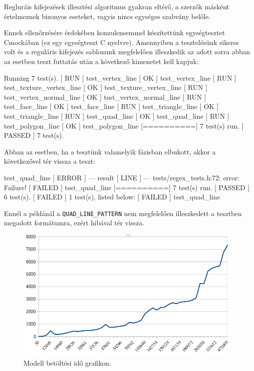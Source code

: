 

Regluráis kifejezések illesztési algoritmus gyakran eltérő, a szerzők másként értelmeznek bizonyos eseteket, vagyis nincs egységes szabvány belőle.

Ennek ellenőrzésére érdekében konzulensemmel készítettünk egységtesztet Cmockában (ez egy egységteszt C nyelvre).\cite{andreas2014cmocka} Amennyiben a tesztelésünk sikeres volt és a reguláris kifejezés sablonunk megfelelően illeszkedik az adott sorra abban az esetben teszt futtatás után a következő kimenetet kell kapjuk:
\bigskip
\begin{python}
[==========] Running 7 test(s).
[ RUN      ] test_vertex_line
[       OK ] test_vertex_line
[ RUN      ] test_texture_vertex_line
[       OK ] test_texture_vertex_line
[ RUN      ] test_vertex_normal_line
[       OK ] test_vertex_normal_line
[ RUN      ] test_face_line
[       OK ] test_face_line
[ RUN      ] test_triangle_line
[       OK ] test_triangle_line
[ RUN      ] test_quad_line
[       OK ] test_quad_line
[ RUN      ] test_polygon_line
[       OK ] test_polygon_line
[==========] 7 test(s) run.
[  PASSED  ] 7 test(s).
\end{python}
\newpage

\noindent Abban az esetben, ha a tesztünk valamelyik fázisban elbukott, akkor a következővel tér vissza a teszt:
\bigskip

\begin{python}
[ RUN      ] test_quad_line
[  ERROR   ] --- result
[   LINE   ] --- tests/regex_tests.h:72: error: Failure!
[  FAILED  ] test_quad_line
[==========] 7 test(s) run.
[  PASSED  ] 6 test(s).
[  FAILED  ] 1 test(s), listed below:
[  FAILED  ] test_quad_line
\end{python}
\bigskip

Ennél a példánál a \texttt{QUAD\_LINE\_PATTERN} nem megfelelően illeszkedett  a tesztben megadott formátumra, ezért hibával tér vissza.

\begin{figure}[h]
\centering
\includegraphics[width=\textwidth]{images/betoltesiido.png}
\caption{Modell betöltési idő grafikon.}
\label{fig:betolt}
\end{figure}

